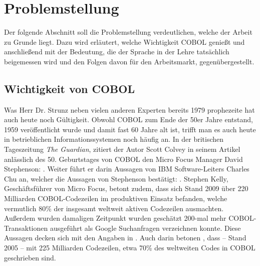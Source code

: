 \section{Problemstellung}\label{problemstellung}
Der folgende Abschnitt soll die Problemstellung verdeutlichen, welche der Arbeit zu Grunde liegt. 
Dazu wird erläutert, welche Wichtigkeit COBOL genießt und anschließend mit der Bedeutung, die der Sprache in der Lehre tatsächlich beigemessen wird und den Folgen davon für den Arbeitsmarkt, gegenübergestellt.

\subsection*{Wichtigkeit von COBOL}\label{wichtigkeit}
 \cite{_ist_1979}

Was Herr Dr. Strunz neben vielen anderen Experten bereits 1979 prophezeite hat auch heute noch Gültigkeit. Obwohl COBOL zum Ende der 50er Jahre entstand, 1959 veröffentlicht wurde und damit fast 60 Jahre alt ist, trifft man es auch heute in betrieblichen Informationssystemen noch häufig an. In der britischen Tageszeitung \textit{The Guardian}, zitiert der Autor Scott Colvey in seinem Artikel \cite{colvey_cobol_2009} anlässlich des 50. Geburtstages von COBOL den Micro Focus Manager David Stephenson: . Weiter führt er darin Aussagen von IBM Software-Leiters Charles Chu an, welcher die Aussagen von Stephenson bestätigt: . Stephen Kelly, Geschäftsführer von Micro Focus, betont zudem, dass sich Stand 2009 über 220 Milliarden COBOL-Codezeilen im produktiven Einsatz befanden, welche vermutlich 80\% der insgesamt weltweit aktiven Codezeilen ausmachten. Außerdem wurden damaligen Zeitpunkt wurden geschätzt 200-mal mehr COBOL-Transaktionen ausgeführt als Google Suchanfragen verzeichnen konnte. \cite{kelly_cobol_2009} Diese Aussagen decken sich mit den Angaben in . Auch darin betonen \citeauthor{doke_cobol_2005}, dass -- Stand 2005 -- mit 225 Milliarden Codezeilen, etwa 70\% des weltweiten Codes in COBOL geschrieben sind.

